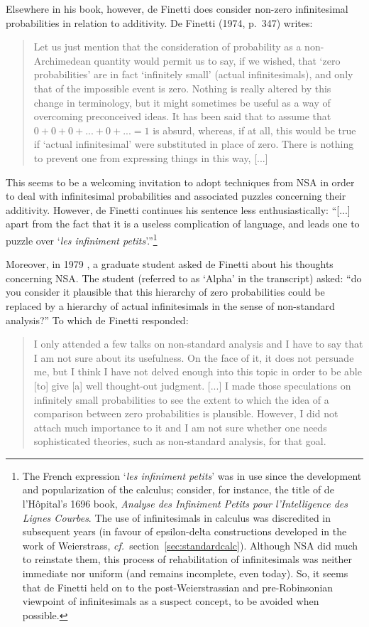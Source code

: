Elsewhere in his book, however, de Finetti does consider non-zero infinitesimal probabilities in relation to additivity.
De Finetti (1974, p.~347) writes:
\begin{quote}
Let us just mention that the consideration of probability as a non-Archimedean quantity would permit us to say, if we wished, that `zero probabilities' are in fact `infinitely small' (actual infinitesimals), and only that of the impossible event is zero. Nothing is really altered by this change in terminology, but it might sometimes be useful as a way of overcoming preconceived ideas. It has been said that to assume that $0+0+0+ ... +0+ ... =1$ is absurd, whereas, if at all, this would be true if `actual infinitesimal' were substituted in place of zero. There is nothing to prevent one from expressing things in this way, [...]
\end{quote}
This seems to be a welcoming invitation to adopt techniques from NSA in order to deal with infinitesimal probabilities and associated puzzles concerning their additivity. However, de Finetti continues his sentence less enthusiastically:
``[...] apart from the fact that it is a useless complication of language, and leads one to puzzle over `\textit{les infiniment petits}'.''\footnote{The French expression `\textit{les infiniment petits}' was in use since the development and popularization of the calculus; consider, for instance, the title of de l'H{\^o}pital's 1696 book, \textit{Analyse des Infiniment Petits pour l'Intelligence des Lignes Courbes}. The use of infinitesimals in calculus was discredited in subsequent years (in favour of epsilon-delta constructions developed in the work of Weierstrass, \textit{cf.}\ section~\ref{sec:standardcalc}). Although NSA did much to reinstate them, this process of rehabilitation of infinitesimals was neither immediate nor uniform (and remains incomplete, even today). So, it seems that de Finetti held on to the post-Weierstrassian and pre-Robinsonian viewpoint of infinitesimals as a suspect concept, to be avoided when possible.}

Moreover, in 1979 \citep[as transcribed in][Ch.~12, p.~122]{deFinetti:2008}, a graduate student asked de Finetti about his thoughts concerning NSA. The student (referred to as `Alpha' in the transcript) asked: ``do you consider it plausible that this hierarchy of zero probabilities could be replaced by a hierarchy of actual infinitesimals in the sense of non-standard analysis?'' To which de Finetti responded:
\begin{quote}
I only attended a few talks on non-standard analysis and I have to say that I am not sure about its usefulness. On the face of it, it does not persuade me, but I think I have not delved enough into this topic in order to be able [to] give [a] well thought-out judgment. [...] I made those speculations on infinitely small probabilities to see the extent to which the idea of a comparison between zero probabilities is plausible. However, I did not attach much importance to it and I am not sure whether one needs sophisticated theories, such as non-standard analysis, for that goal.
\end{quote}

